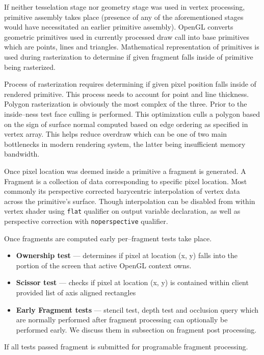 If neither tesselation stage nor geometry stage was used in vertex processing, primitive assembly takes place (presence of any of the aforementioned stages would have necessitated an earlier primitive assembly).
OpenGL converts geometric primitives used in currently processed draw call into base primitives which are points, lines and triangles.
Mathematical representation of primitives is used during rasterization to determine if given fragment falls inside of primitive being rasterized.

Process of rasterization requires determining if given pixel position falls inside of rendered primitive. This process needs to account for point and line thickness.
Polygon rasterization is obviously the most complex of the three. Prior to the inside--ness test face culling is performed. 
This optimization culls a polygon based on the sign of surface normal computed based on edge ordering as specified in vertex array.
This helps reduce overdraw which can be one of two main bottlenecks in modern rendering system, the latter being insufficient memory bandwidth.

Once pixel location was deemed inside a primitive a fragment is generated. 
A Fragment is a collection of data corresponding to specific pixel location.
Most commonly its perspective corrected barycentric interpolation of vertex data across the primitive's surface.
Though interpolation can be disabled from within vertex shader using \texttt{flat} qualifier on output variable declaration,
as well as perspective correction with \texttt{noperspective} qualifier.

Once fragments are computed early per--fragment tests take place.

\begin{itemize}
    \item \textbf{Ownership test} --- determines if pixel at location (x, y) falls into the portion of the screen that active OpenGL context owns.
    \item \textbf{Scissor test} --- checks if pixel at location (x, y) is contained within client provided list of axis aligned rectangles
    \item \textbf{Early Fragment tests} --- stencil test, depth test and occlusion query which are normally performed after fragment processing can optionally be performed early. We discuss them in subsection on fragment post processing.
\end{itemize}

If all tests passed fragment is submitted for programable fragment processing.

